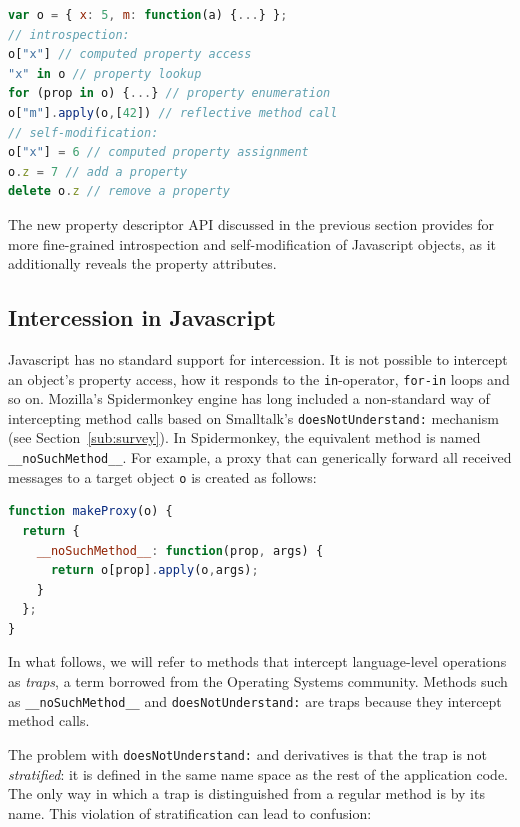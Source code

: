 \documentclass{sig-alternate}
\newcommand{\noSuchMethod}{\texttt{\_\_noSuchMethod\_\_}}
\begin{document}
\begin{lstlisting}[language=javascript]
var o = { x: 5, m: function(a) {...} };
// introspection:
o["x"] // computed property access
"x" in o // property lookup
for (prop in o) {...} // property enumeration
o["m"].apply(o,[42]) // reflective method call
// self-modification:
o["x"] = 6 // computed property assignment
o.z = 7 // add a property
delete o.z // remove a property
\end{lstlisting}

The new property descriptor API discussed in the previous section provides for more fine-grained introspection and self-modification of Javascript objects, as it additionally reveals the property attributes.

\subsection{Intercession in Javascript}
\label{sub:intercession_in_javascript}

Javascript has no standard support for intercession. It is not possible to intercept an object's property access, how it responds to the \texttt{in}-operator, \texttt{for-in} loops and so on. Mozilla's Spidermonkey engine has long included a non-standard way of intercepting method calls based on Smalltalk's \texttt{doesNotUnderstand:} mechanism (see Section~\ref{sub:survey}). In Spidermonkey, the equivalent method is named \noSuchMethod{}. For example, a proxy that can generically forward all received messages to a target object \texttt{o} is created as follows:

\begin{lstlisting}[language=javascript]
function makeProxy(o) {
  return {
    __noSuchMethod__: function(prop, args) {
      return o[prop].apply(o,args);
    }
  };
}
\end{lstlisting}

In what follows, we will refer to methods that intercept language-level operations as \emph{traps}, a term borrowed from the Operating Systems community. Methods such as \noSuchMethod{} and \texttt{doesNotUnderstand:} are traps because they intercept method calls.

The problem with \texttt{doesNotUnderstand:} and derivatives is that the trap is not \emph{stratified}: it is defined in the same name space as the rest of the application code. The only way in which a trap is distinguished from a regular method is by its name. This violation of stratification can lead to confusion:
\end{document}
